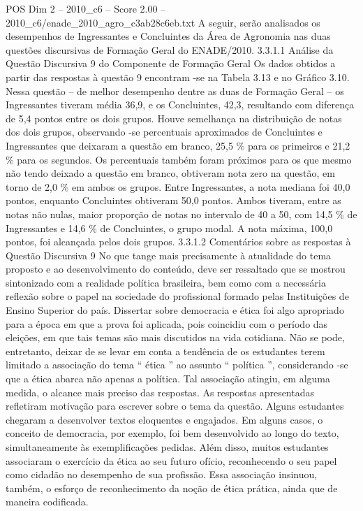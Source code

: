 \begin{textsample}{POS Dim 2 – 2010\_c6 – Score 2.00 – 2010\_c6/enade\_2010\_agro\_c3ab28c6eb.txt}
A seguir, serão analisados os desempenhos de Ingressantes e Concluintes da Área de Agronomia nas duas questões discursivas de Formação Geral do ENADE/2010. 3.3.1.1 Análise da Questão Discursiva 9 do Componente de Formação Geral Os dados obtidos a partir das respostas à questão 9 encontram -se na Tabela 3.13 e no Gráfico 3.10.
Nessa questão – de melhor desempenho dentre as duas de Formação Geral – os Ingressantes tiveram média 36,9, e os Concluintes, 42,3, resultando com diferença de 5,4 pontos entre os dois grupos.
Houve semelhança na distribuição de notas dos dois grupos, observando -se percentuais aproximados de Concluintes e Ingressantes que deixaram a questão em branco, 25,5 \% para os primeiros e 21,2 \% para os segundos.
Os percentuais também foram próximos para os que mesmo não tendo deixado a questão em branco, obtiveram nota zero na questão, em torno de 2,0 \% em ambos os grupos.
Entre Ingressantes, a nota mediana foi 40,0 pontos, enquanto Concluintes obtiveram 50,0 pontos.
Ambos tiveram, entre as notas não nulas, maior proporção de notas no intervalo de 40 a 50, com 14,5 \% de Ingressantes e 14,6 \% de Concluintes, o grupo modal.
A nota máxima, 100,0 pontos, foi alcançada pelos dois grupos. 3.3.1.2 Comentários sobre as respostas à Questão Discursiva 9 No que tange mais precisamente à atualidade do tema proposto e ao desenvolvimento do conteúdo, deve ser ressaltado que se mostrou sintonizado com a realidade política brasileira, bem como com a necessária reflexão sobre o papel na sociedade do profissional formado pelas Instituições de Ensino Superior do país.
Dissertar sobre democracia e ética foi algo apropriado para a época em que a prova foi aplicada, pois coincidiu com o período das eleições, em que tais temas são mais discutidos na vida cotidiana.
Não se pode, entretanto, deixar de se levar em conta a tendência de os estudantes terem limitado a associação do tema “ ética ” ao assunto “ política ”, considerando -se que a ética abarca não apenas a política.
Tal associação atingiu, em alguma medida, o alcance mais preciso das respostas.
As respostas apresentadas refletiram motivação para escrever sobre o tema da questão.
Alguns estudantes chegaram a desenvolver textos eloquentes e engajados.
Em alguns casos, o conceito de democracia, por exemplo, foi bem desenvolvido ao longo do texto, simultaneamente às exemplificações pedidas.
Além disso, muitos estudantes associaram o exercício da ética ao seu futuro ofício, reconhecendo o seu papel como cidadão no desempenho de sua profissão.
Essa associação insinuou, também, o esforço de reconhecimento da noção de ética prática, ainda que de maneira codificada.

\end{textsample}
